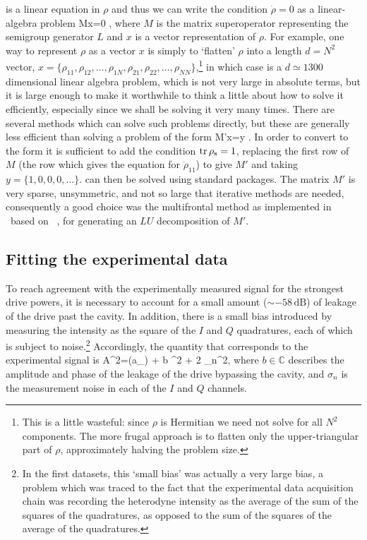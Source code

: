  is a linear equation in $\rho$ and thus we can write the condition $\dot\rho=0$ as a linear-algebra problem
\be\label{eq:linalg}
    Mx=0 ,
\ee
where $M$ is the matrix superoperator representing the semigroup generator $L$ and $x$ is a vector representation of $\rho$. For example, one way to represent $\rho$ as a vector $x$ is simply to `flatten' $\rho$ into a length $d=N^2$ vector, $x=\{\rho_{11},\rho_{12},\ldots,\rho_{1N},\rho_{21},\rho_{22},\ldots,\rho_{NN}\}$,\footnote{This is a little wasteful: since $\rho$ is Hermitian we need not solve for all $N^2$ components. The more frugal approach is to flatten only the upper-triangular part of $\rho$, approximately halving the problem size.} in which case  is a $d\simeq1300$ dimensional linear algebra problem, which is not very large in absolute terms, but it is large enough to make it worthwhile to think a little about how to solve it efficiently, especially since we shall be solving it very many times. There are several methods which can solve such problems directly, but these are generally less efficient than solving a problem of the form
\be\label{eq:linalg2}
    M'x=y .
\ee
In order to convert  to the form  it is sufficient to add the condition $\operatorname{tr}\rho_\text{s}=1$, replacing the first row of $M$ (the row which gives the equation for $\dot\rho_{11}$) to give $M'$ and taking $y=\{1,0,0,0,\ldots\}$.  can then be solved using standard packages. The matrix $M'$ is very sparse, unsymmetric, and not so large that iterative methods are needed, consequently a good choice was the multifrontal method as implemented in \mma\ based on \umfpack~\cite{UMFPACK}, for generating an $LU$ decomposition of $M'$.

\subsection{Fitting the experimental data}\label{sec:fitting}
To reach agreement with the experimentally measured signal for the strongest drive powers, it is necessary to account for a small amount ($\sim-58\,\text{dB}$) of leakage of the drive past the cavity. In addition, there is a small bias introduced by measuring the intensity as the square of the $I$ and $Q$ quadratures, each of which is subject to noise.\footnote{In the first datasets, this `small bias' was actually a very large bias, a problem which was traced to the fact that the experimental data acquisition chain was recording the heterodyne intensity as the average of the sum of the squares of the quadratures, as opposed to the sum of the squares of the average of the quadratures.} Accordingly, the quantity that corresponds to the experimental signal is
\be
    \label{eq:signal}
    A^2=\amp\tr(a\mspace{1.5mu}\rho_) + b \xi \rvert^2 + 2 \sigma_n^2,
\ee
where $b\in\mathbb{C}$ describes the amplitude and phase of the leakage of the drive bypassing the cavity, and $\sigma_n$%
is the measurement noise in each of the $I$ and $Q$ channels.

